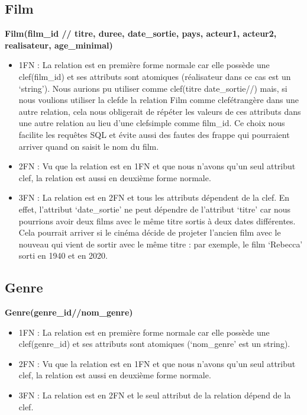 \documentclass[12pt]{article}
\begin{document}
\subsection{Film}
\textbf{Film(film{\_}id // titre, duree, date{\_}sortie, pays, acteur1, acteur2, realisateur, age{\_}minimal)}
\begin{itemize}
    \item 1FN : La relation est en première forme normale car elle possède une clef(film{\_}id) et 
    ses attributs sont atomiques (réalisateur dans ce cas est un ‘string’). Nous aurions pu utiliser 
    comme clef(titre date{\_}sortie//) mais, si nous voulions utiliser la clefde la relation Film comme 
    clefétrangère dans une autre relation, cela nous obligerait de répéter les valeurs de ces attributs dans 
    une autre relation au lieu d’une clefsimple comme film{\_}id. Ce choix nous 
    facilite les requêtes SQL et évite aussi des fautes des frappe qui pourraient arriver quand on saisit le nom du film. 
    \item 2FN : Vu que la relation est en 1FN et que nous n'avons qu'un seul attribut clef, la relation est aussi
    en deuxième forme normale.
    \item 3FN : La relation est en 2FN et tous les attributs dépendent de la clef. 
    En effet, l’attribut ‘date{\_}sortie’ ne peut dépendre de l’attribut ‘titre’ 
    car nous pourrions avoir deux films avec le même titre sortis à deux dates différentes. 
    Cela pourrait arriver si le cinéma décide de projeter l’ancien film avec le nouveau 
    qui vient de sortir avec le même titre : 
    par exemple, le film ‘Rebecca’ sorti en 1940 et en 2020.
\end{itemize}
\subsection{Genre}
\textbf{Genre(genre{\_}id//nom{\_}genre)}
\begin{itemize}
    \item 1FN : La relation est en première forme normale car elle possède une clef(genre{\_}id) et ses attributs sont atomiques (‘nom{\_}genre’ est un string). 
    \item 2FN : Vu que la relation est en 1FN et que nous n'avons qu'un seul attribut clef, la relation est aussi
    en deuxième forme normale.
    \item 3FN : La relation est en 2FN et le seul attribut de la relation dépend de la clef.
\end{itemize}
\pagebreak
\end{document}
